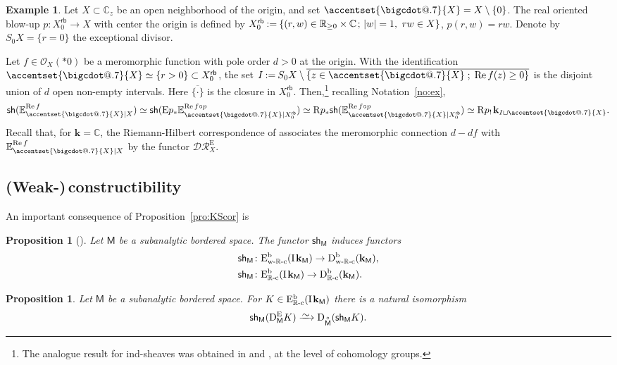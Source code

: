 \documentclass[JEP,XML,SOM,Unicode]{cedram}
\makeatletter
\let\mathcal\mathscr
\newcommand{\isom}{\xrightarrow{{\raisebox{-.6ex}[0ex][0ex]{$\mspace{1mu}\textstyle\sim\mspace{2mu}$}}}}
\let\ol\overline
\newcommand*\bigcdot{\mathpalette\bigcdot@{.7}}
\newcommand*\bigcdot@[2]{\mathbin{\vcenter{\hbox{\scalebox{#2}{$\m@th#1\bullet$}}}}}
\newcommand{\bdot}[1]{{\accentset{\bigcdot}{#1}}\vphantom{#1}}
\newcommand{\semicolon}{\nobreak \mskip2mu\mathpunct{}\nonscript\mkern-\thinmuskip{;}\mskip6mu plus1mu\relax}
\theoremstyle{plain}
\newtheorem{proposition}[theorem]{Proposition}
\theoremstyle{definition}
\newtheorem{example}[theorem]{Example}
\newcommand{\C}{\mathbb{C}}
\newcommand{\R}{\mathbb{R}}
\renewcommand{\Re}{\operatorname{Re}}
\newcommand{\derived}[1]{\mathrm{#1}}
\newcommand{\derd}{\derived{D}}
\newcommand{\dere}{\derived{E}}\let\enh\dere
\newcommand{\derr}{\derived{R}}
\newcommand{\BDC}{\derd^{\mathrm{b}}}
\newcommand{\BECRc}[2][\ifield]{\dere^{\mathrm{b}}_\Rc(#1_{#2})}
\newcommand{\BECwRc}[2][\ifield]{\dere^{\mathrm{b}}_\wRc(#1_{#2})}
\newcommand{\roim}[1]{\derr#1_*}
\newcommand{\reim}[1]{\derr#1_{\mspace{.5mu}!}\mspace{2mu}}
\newcommand{\drE}[1][X]{\mathcal{DR}^\enh_{#1}}
\newcommand{\sheaffont}[1]{\mathcal{#1}}
\renewcommand{\O}{\sheaffont{O}}
\newcommand{\Edual}{\dual^\enh}
\newcommand{\Eoim}[1]{\enh#1_*}
\newcommand{\dual}{\mathrm{D}}
\newcommand{\Rc}{{\R\text-\mathrm{c}}}
\newcommand{\wRc}{{\mathrm{w}\text-\R\text-\mathrm{c}}}
\newcommand{\field}{\mathbf{k}}\let\cor\field
\newcommand{\ind}{\mathrm{I}\mspace{2mu}}
\newcommand{\ifield}{\ind\field}
\newcommand{\unbordered}[1]{{\accentset{\circ}{#1}}}
\newcommand{\rb}{\mathsf{rb}}
\newcommand{\sh}{\mathsf{sh}}
\newcommand{\bbM}{\mathsf{M}}
\newcommand{\obM}{\unbordered{\bbM}}
\newcommand{\Ex}{\mathbb{E}}
\newcommand{\RB}[2][N]{#2_{#1}^{\rb}}
\newcommand{\defeq}{\mathbin{:=}}\let \seteq\defeq
\newcommand{\st}[1]{{\{{#1}\}}}
\makeatother
\begin{document}
\begin{example}
Let $X\subset \C_z$ be an open neighborhood of the origin, and set $\bdot X=X\setminus\st0$.
The real oriented blow-up $p\colon \RB[0]X \to X$ with center the origin is
defined by $\RB[0]X \defeq\st{(r,w)\in\R_{\ge0}\times\C\semicolon |w|=1,\ rw\in X}$,
$p(r,w)=r w$. Denote by $S_0X=\st{r=0}$ the exceptional divisor.

Let $f\in\O_X(*0)$ be a meromorphic function with pole order $d>0$
at the origin.
With the identification $\bdot X\simeq\st{r>0}\subset\RB[0]X$, the set
$I\seteq S_0X\setminus\ol{\st{z\in\bdot X\;;\;\Re f(z)\ge0}}$
is the disjoint union of $d$ open non-empty intervals.
Here
$\ol{\st{\cdot}}$ is the closure in $\RB[0]X$.
Then,\footnote{The analogue result for ind-sheaves was obtained in \cite[Prop.\,7.3]{KS03} and \cite[Prop.\,3.14]{IT20}, at the level of cohomology groups.} recalling Notation~\ref{no:ex},
\[
\sh(\Ex_{\bdot X|X}^{\Re f}) \simeq
\sh (\Eoim p \Ex_{\bdot X|\RB[0]X}^{\Re f\circ p})
\simeq \roim p\sh ( \Ex_{\bdot X|\RB[0]X}^{\Re f\circ p})\simeq
\reim p \field_{I\sqcup\bdot X}.
\]
Recall that, for $\field=\C$, the Riemann-Hilbert correspondence of \cite{DK16} associates the meromorphic connection $d-df$ with $\Ex_{\bdot X|X}^{\Re f}$ by the functor $\drE$.
\end{example}

\subsection{(Weak-)\,constructibility}

An important consequence of Proposition~\ref{pro:KScor} is

\begin{proposition}[{\cite[Th.\,6.6.4]{KS16}}]
Let $\bbM$ be a subanalytic bordered space.
The functor $\sh_\bbM$ induces functors
\begin{align*}
\sh_\bbM&\colon\BECwRc \bbM \to \BDC_\wRc(\field_\bbM), \\
\sh_\bbM&\colon\BECRc \bbM \to \BDC_\Rc(\field_\bbM).
\end{align*}
\end{proposition}

\begin{proposition}
Let $\bbM$ be a subanalytic bordered space.
For $K\in\BECRc \bbM$ there is a natural isomorphism
\[
\sh_\bbM( \Edual_\bbM K) \isom \dual_\obM( \sh_\bbM K).
\]
\end{proposition}
\end{document}
